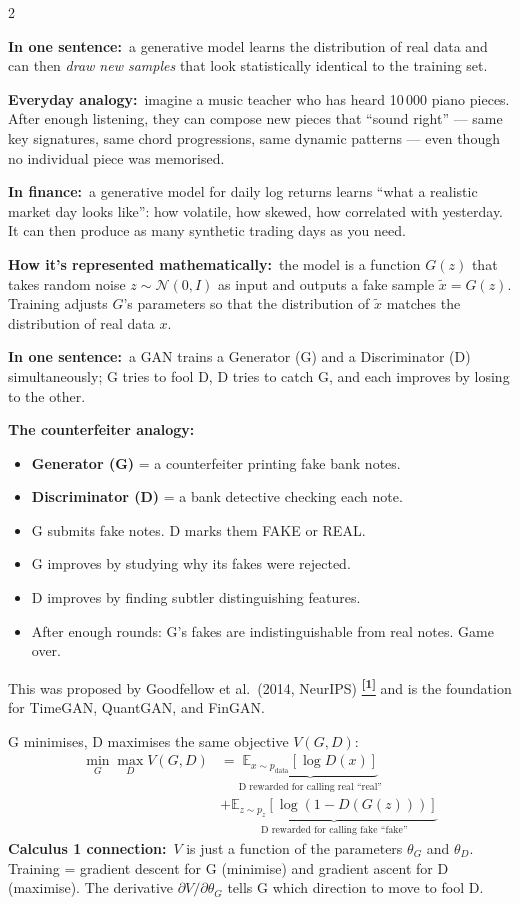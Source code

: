 \documentclass[10pt]{article}
\newcommand{\navybox}[2]{\begin{tcolorbox}[mybox={Navy}{LBg},title={#1}]#2\end{tcolorbox}}
\newcommand{\skybox}[2]{\begin{tcolorbox}[mybox={Sky}{BBg},title={#1}]#2\end{tcolorbox}}
\newcommand{\tealbox}[2]{\begin{tcolorbox}[mybox={Teal}{LBg},title={#1}]#2\end{tcolorbox}}
\newcommand{\tcite}[1]{%
  \hyperlink{R:#1}{\textsuperscript{\scriptsize\textbf{[#1]}}}}
\newcommand{\E}{\mathbb{E}}
\begin{document}
\begin{multicols}{2}

\navybox{What is a Generative Model?}{%
\textbf{In one sentence:}\ a generative model learns the distribution of real data and can then \emph{draw new samples} that look statistically identical to the training set.

\smallskip
\textbf{Everyday analogy:}\ imagine a music teacher who has heard 10\,000 piano pieces. After enough listening, they can compose new pieces that ``sound right'' --- same key signatures, same chord progressions, same dynamic patterns --- even though no individual piece was memorised.

\smallskip
\textbf{In finance:}\ a generative model for daily log returns learns ``what a realistic market day looks like'': how volatile, how skewed, how correlated with yesterday. It can then produce as many synthetic trading days as you need.

\smallskip
\textbf{How it's represented mathematically:}\ the model is a function $G(z)$ that takes random noise $z \sim \mathcal{N}(0,I)$ as input and outputs a fake sample $\tilde{x} = G(z)$. Training adjusts $G$'s parameters so that the distribution of $\tilde{x}$ matches the distribution of real data $x$.}

\skybox{The GAN: Two AIs Competing}{%
\textbf{In one sentence:}\ a GAN trains a Generator (G) and a Discriminator (D) simultaneously; G tries to fool D, D tries to catch G, and each improves by losing to the other.

\smallskip
\textbf{The counterfeiter analogy:}
\begin{itemize}
  \item \textbf{Generator (G)} = a counterfeiter printing fake bank notes.
  \item \textbf{Discriminator (D)} = a bank detective checking each note.
  \item G submits fake notes. D marks them FAKE or REAL.
  \item G improves by studying why its fakes were rejected.
  \item D improves by finding subtler distinguishing features.
  \item After enough rounds: G's fakes are indistinguishable from real notes. Game over.
\end{itemize}
This was proposed by Goodfellow et al.\ (2014, NeurIPS)\tcite{1} and is the foundation for TimeGAN, QuantGAN, and FinGAN.}

\tealbox{The Math of the Competition (Minimax Game)}{%
G minimises, D maximises the same objective $V(G,D)$:
\begin{align*}
\min_G \max_D V(G,D) &=
  \underbrace{\E_{x\sim p_\text{data}}[\log D(x)]}_\text{D rewarded for calling real ``real''} \\
  &+\underbrace{\E_{z\sim p_z}[\log(1-D(G(z)))]}_\text{D rewarded for calling fake ``fake''}
\end{align*}
\textbf{Calculus 1 connection:}\ $V$ is just a function of the parameters $\theta_G$ and $\theta_D$. Training = gradient descent for G (minimise) and gradient ascent for D (maximise). The derivative $\partial V / \partial \theta_G$ tells G which direction to move to fool D.

}
\end{multicols}
\end{document}
